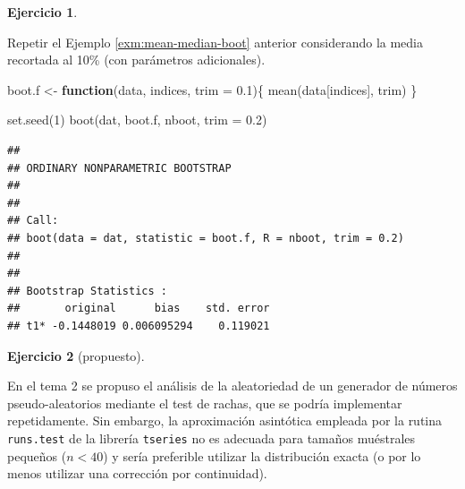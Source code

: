 \documentclass[
]{book}
\newenvironment{Shaded}{\begin{snugshade}}{\end{snugshade}}
\newcommand{\AttributeTok}[1]{\textcolor[rgb]{0.77,0.63,0.00}{#1}}
\newcommand{\ControlFlowTok}[1]{\textcolor[rgb]{0.13,0.29,0.53}{\textbf{#1}}}
\newcommand{\DecValTok}[1]{\textcolor[rgb]{0.00,0.00,0.81}{#1}}
\newcommand{\FloatTok}[1]{\textcolor[rgb]{0.00,0.00,0.81}{#1}}
\newcommand{\FunctionTok}[1]{\textcolor[rgb]{0.00,0.00,0.00}{#1}}
\newcommand{\NormalTok}[1]{#1}
\newcommand{\OtherTok}[1]{\textcolor[rgb]{0.56,0.35,0.01}{#1}}
\theoremstyle{break}
\theoremstyle{definition}
\theoremstyle{definition}
\theoremstyle{definition}
\newtheorem{exercise}{Ejercicio}[chapter]
\theoremstyle{definition}
\theoremstyle{remark}
\begin{document}
\begin{exercise}
\protect\hypertarget{exr:mean-trim-boot}{}{\label{exr:mean-trim-boot} }
\end{exercise}

Repetir el Ejemplo \ref{exm:mean-median-boot} anterior considerando la media recortada al 10\%
(con parámetros adicionales).

\begin{Shaded}
\begin{Highlighting}[]
\NormalTok{boot.f }\OtherTok{\textless{}{-}} \ControlFlowTok{function}\NormalTok{(data, indices, }\AttributeTok{trim =} \FloatTok{0.1}\NormalTok{)\{}
  \FunctionTok{mean}\NormalTok{(data[indices], trim)}
\NormalTok{\}}

\FunctionTok{set.seed}\NormalTok{(}\DecValTok{1}\NormalTok{)}
\FunctionTok{boot}\NormalTok{(dat, boot.f, nboot, }\AttributeTok{trim =} \FloatTok{0.2}\NormalTok{)}
\end{Highlighting}
\end{Shaded}

\begin{verbatim}
## 
## ORDINARY NONPARAMETRIC BOOTSTRAP
## 
## 
## Call:
## boot(data = dat, statistic = boot.f, R = nboot, trim = 0.2)
## 
## 
## Bootstrap Statistics :
##       original      bias    std. error
## t1* -0.1448019 0.006095294    0.119021
\end{verbatim}

\vspace{0.5cm}

\begin{exercise}[propuesto]
\protect\hypertarget{exr:rachas-sim}{}{\label{exr:rachas-sim} {} }
\end{exercise}

En el tema 2 se propuso el análisis de la aleatoriedad de un
generador de números pseudo-aleatorios mediante el test de rachas,
que se podría implementar repetidamente. Sin embargo, la
aproximación asintótica empleada por la rutina \texttt{runs.test} de la
librería \texttt{tseries} no es adecuada para tamaños muéstrales pequeños
(\(n<40\)) y sería preferible utilizar la distribución exacta (o
por lo menos utilizar una corrección por continuidad).
\end{document}
